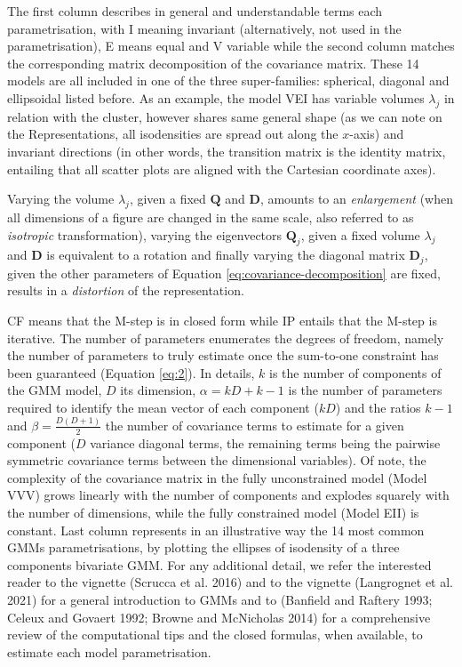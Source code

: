 The first column describes in general and understandable terms each parametrisation, with I meaning invariant (alternatively, not used in the parametrisation), E means equal and V variable while the second column matches the corresponding matrix decomposition of the covariance matrix. These 14 models are all included in one of the three super-families: spherical, diagonal and ellipsoidal listed before. As an example, the model VEI has variable volumes \(\lambda_j\) in relation with the cluster, however shares same general shape (as we can note on the Representations, all isodensities are spread out along the \(x\)-axis) and invariant directions (in other words, the transition matrix is the identity matrix, entailing that all scatter plots are aligned with the Cartesian coordinate axes).

Varying the volume \(\lambda_j\), given a fixed \(\boldsymbol{Q}\) and \(\boldsymbol{D}\), amounts to an \emph{enlargement} (when all dimensions of a figure are changed in the same scale, also referred to as \emph{isotropic} transformation), varying the eigenvectors \(\boldsymbol{Q}_j\), given a fixed volume \(\lambda_j\) and \(\boldsymbol{D}\) is equivalent to a rotation and finally varying the diagonal matrix \(\boldsymbol{D}_j\), given the other parameters of Equation \eqref{eq:covariance-decomposition} are fixed, results in a \emph{distortion} of the representation.

CF means that the M-step is in closed form while IP entails that the M-step is iterative. The number of parameters enumerates the degrees of freedom, namely the number of parameters to truly estimate once the sum-to-one constraint has been guaranteed (Equation \eqref{eq:2}). In details, \(k\) is the number of components of the GMM model, \(D\) its dimension, \(\alpha=kD + k - 1\) is the number of parameters required to identify the mean vector of each component (\(kD\)) and the ratios \(k-1\) and \(\beta=\frac{D(D+1)}{2}\) the number of covariance terms to estimate for a given component (\(D\) variance diagonal terms, the remaining terms being the pairwise symmetric covariance terms between the dimensional variables). Of note, the complexity of the covariance matrix in the fully unconstrained model (Model VVV) grows linearly with the number of components and explodes squarely with the number of dimensions, while the fully constrained model (Model EII) is constant. Last column represents in an illustrative way the 14 most common GMMs parametrisations, by plotting the ellipses of isodensity of a three components bivariate GMM. For any additional detail, we refer the interested reader to the  vignette (Scrucca et al. 2016) and to the  vignette (Langrognet et al. 2021) for a general introduction to GMMs and to (Banfield and Raftery 1993; Celeux and Govaert 1992; Browne and McNicholas 2014) for a comprehensive review of the computational tips and the closed formulas, when available, to estimate each model parametrisation.

